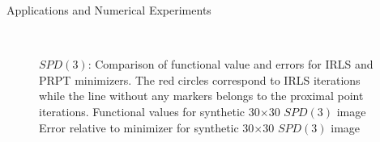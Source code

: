 \begin{chapter}{Applications and Numerical Experiments}
\begin{figure}[h!]
    \centering
    \\
    \caption[Comparison IRLS \& PRPT for $SPD(3)$]{$SPD(3)$: Comparison of functional value and errors for IRLS and PRPT minimizers.
	The red circles correspond to IRLS iterations while the line without any markers belongs to the proximal point iterations.
	 Functional values for synthetic 30$\times$30 $SPD(3)$ image
	  Error relative to minimizer for synthetic 30$\times$30 $SPD(3)$ image
	\label{fig:comparison_spd}
    }
\end{figure}


\FloatBarrier

\end{chapter}
